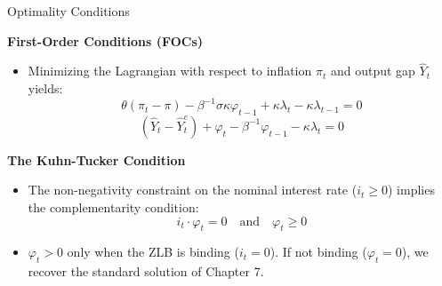 \documentclass[11pt,aspectratio=169]{beamer}
\begin{document}
\begin{frame}{Optimality Conditions}
\small

\textbf{First-Order Conditions (FOCs)}
\begin{itemize}
    \item Minimizing the Lagrangian with respect to inflation $\pi_t$ and output gap $\hat{Y}_{t}$ yields:
    \begin{equation}
        \theta (\pi _{t}-\pi )-\beta ^{-1}\sigma \kappa \varphi _{t-1}+\kappa \lambda _{t}-\kappa \lambda _{t-1}=0 \label{FOCzl1}
    \end{equation}
    \begin{equation}
        (\hat{Y}_{t}-\hat{Y}_{t}^{e})+\varphi _{t}-\beta ^{-1}\varphi _{t-1}-\kappa \lambda _{t}=0 \label{FOCzl2}
    \end{equation}
\end{itemize}

\vspace{0.2cm}

\textbf{The Kuhn-Tucker Condition}
\begin{itemize}
    \item The non-negativity constraint on the nominal interest rate ($i_t \ge 0$) implies the complementarity condition:
    \begin{equation*}
        i_{t} \cdot \varphi _{t} = 0 \quad \text{and} \quad \varphi_t \ge 0
    \end{equation*}
    \item $\varphi_t > 0$ only when the ZLB is binding ($i_t = 0$). If not binding ($\varphi_t = 0$), we recover the standard solution of Chapter 7.
\end{itemize}
\end{frame}
\end{document}
